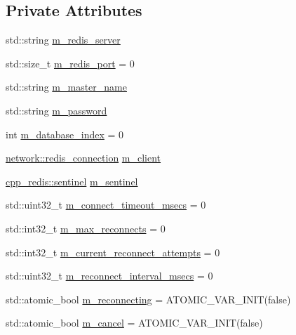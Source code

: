 \subsection*{Private Attributes}
\begin{DoxyCompactItemize}
\item 
std\+::string \hyperlink{classcpp__redis_1_1client_acbe90e4208d17c8769f38c131c4872c1}{m\+\_\+redis\+\_\+server}
\item 
std\+::size\+\_\+t \hyperlink{classcpp__redis_1_1client_a5f54838ce91f92a32383a27224a78f2f}{m\+\_\+redis\+\_\+port} = 0
\item 
std\+::string \hyperlink{classcpp__redis_1_1client_ab9ccf298c144e30b924e87fba89dbc4c}{m\+\_\+master\+\_\+name}
\item 
std\+::string \hyperlink{classcpp__redis_1_1client_aa3f271f2e05a020afca0c45cee0a97a5}{m\+\_\+password}
\item 
int \hyperlink{classcpp__redis_1_1client_acfc4137394507418cd4a81021da3aee3}{m\+\_\+database\+\_\+index} = 0
\item 
\hyperlink{classcpp__redis_1_1network_1_1redis__connection}{network\+::redis\+\_\+connection} \hyperlink{classcpp__redis_1_1client_a20c60a836610c74ea13da68668facad2}{m\+\_\+client}
\item 
\hyperlink{classcpp__redis_1_1sentinel}{cpp\+\_\+redis\+::sentinel} \hyperlink{classcpp__redis_1_1client_a79979ccbffa192119ae2f0c03aaa6130}{m\+\_\+sentinel}
\item 
std\+::uint32\+\_\+t \hyperlink{classcpp__redis_1_1client_ad8ca54d72d5a893b8455da2b87cd143c}{m\+\_\+connect\+\_\+timeout\+\_\+msecs} = 0
\item 
std\+::int32\+\_\+t \hyperlink{classcpp__redis_1_1client_ac7e62a03f54baa0a18fa48c90b595d85}{m\+\_\+max\+\_\+reconnects} = 0
\item 
std\+::int32\+\_\+t \hyperlink{classcpp__redis_1_1client_a30ae95e31ccb5591c2f383c6fef379b3}{m\+\_\+current\+\_\+reconnect\+\_\+attempts} = 0
\item 
std\+::uint32\+\_\+t \hyperlink{classcpp__redis_1_1client_adb478e35d9d590bac2651ae30be3e7f4}{m\+\_\+reconnect\+\_\+interval\+\_\+msecs} = 0
\item 
std\+::atomic\+\_\+bool \hyperlink{classcpp__redis_1_1client_a1495e363fa8a95e5fbbf95270abfe584}{m\+\_\+reconnecting} = A\+T\+O\+M\+I\+C\+\_\+\+V\+A\+R\+\_\+\+I\+N\+IT(false)
\item 
std\+::atomic\+\_\+bool \hyperlink{classcpp__redis_1_1client_ac69767309023f573c16dd855bd7a3c83}{m\+\_\+cancel} = A\+T\+O\+M\+I\+C\+\_\+\+V\+A\+R\+\_\+\+I\+N\+IT(false)

\end{DoxyCompactItemize}
